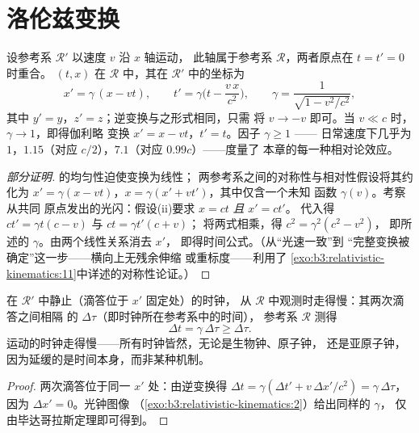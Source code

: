 \section{洛伦兹变换}

\begin{theorem}[洛伦兹变换]\label{thm:b3:relativistic-kinematics:lorentz}
设参考系 $\mathcal R'$ 以速度 $v$ 沿 $x$ 轴运动，
此轴属于参考系 $\mathcal R$，两者原点在 $t = t' = 0$ 时重合。
 $(t, x)$ 在 $\mathcal R$ 中，其在 $\mathcal R'$ 中的坐标为
\[
x' = \gamma\,(x - vt) , \qquad
t' = \gamma\Big(t - \frac{v\,x}{c^2}\Big) , \qquad
\gamma = \frac{1}{\sqrt{1 - v^2/c^2}} ,
\]
其中 $y' = y$，$z' = z$；逆变换与之形式相同，只需
将 $v \to -v$ 即可。当 $v \ll c$ 时，$\gamma \to 1$，即得伽利略
变换 $x' = x - vt$，$t' = t$。因子 $\gamma \ge 1$ ——
日常速度下几乎为 $1$，$1.15$（对应 $c/2$），$7.1$（对应 $0.99c$）——度量了
本章的每一种相对论效应。
\end{theorem}

\begin{proof}[部分证明]
的均匀性迫使变换为线性；
两参考系之间的对称性与相对性假设将其约化为
$x' = \gamma(x - vt)$，$x = \gamma(x' + vt')$，其中仅含一个未知
函数 $\gamma(v)$。考察从共同
原点发出的光闪：假设(ii)要求 $x = ct$ \emph{且} $x' = ct'$。
代入得 $ct' = \gamma t(c - v)$ 与 $ct = \gamma t'(c + v)$；
将两式相乘，得 $c^2 = \gamma^2(c^2 - v^2)$，
即所述的 $\gamma$。由两个线性关系消去 $x'$，
即得时间公式。（从“光速一致”到
“完整变换被确定”这一步——横向上无残余伸缩
或重标度——利用了
\cref{exo:b3:relativistic-kinematics:11}中详述的对称性论证。）
\end{proof}

\begin{proposition}[时间延缓]\label{prop:b3:relativistic-kinematics:dilation}
在 $\mathcal R'$ 中静止（滴答位于 $x'$ 固定处）的时钟，
从 $\mathcal R$ 中观测时走得慢：其两次滴答之间相隔
的\emph{} $\Delta\tau$（即时钟所在参考系中的时间），
参考系 $\mathcal R$ 测得
\[
\Delta t = \gamma\,\Delta\tau \ge \Delta\tau .
\]
运动的时钟走得慢——所有时钟皆然，无论是生物钟、原子钟，
还是亚原子钟，因为延缓的是时间本身，而非某种机制。
\end{proposition}

\begin{proof}
两次滴答位于同一 $x'$ 处：由逆变换得 $\Delta t
= \gamma(\Delta t' + v\,\Delta x'/c^2) = \gamma\,\Delta\tau$，因为
$\Delta x' = 0$。光钟图像
（\cref{exo:b3:relativistic-kinematics:2}）给出同样的 $\gamma$，
仅由毕达哥拉斯定理即可得到。
\end{proof}

